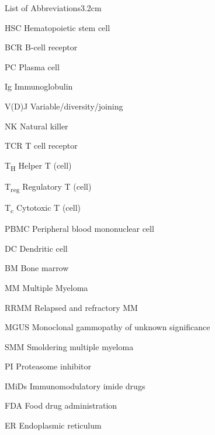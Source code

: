 \begin{mclistof}{List of Abbreviations}{3.2cm}

\item[HSC] Hematopoietic stem cell

\item[BCR] B-cell receptor

\item[PC] Plasma cell

\item[Ig] Immunoglobulin

\item[V(D)J] Variable/diversity/joining

\item[NK] Natural killer

\item[TCR] T cell receptor

\item[T\textsubscript{H}] Helper T (cell)

\item[T\textsubscript{reg}] Regulatory T (cell)

\item[T\textsubscript{c}] Cytotoxic T (cell)

\item[PBMC] Peripheral blood mononuclear cell

\item[DC] Dendritic cell

\item[BM] Bone marrow

\item[MM] Multiple Myeloma

\item[RRMM] Relapsed and refractory MM

\item[MGUS] Monoclonal gammopathy of unknown significance

\item[SMM] Smoldering multiple myeloma

\item[PI] Proteasome inhibitor

\item[IMiDs] Immunomodulatory imide drugs

\item[FDA] Food drug administration

\item[ER] Endoplasmic reticulum


\end{mclistof}
